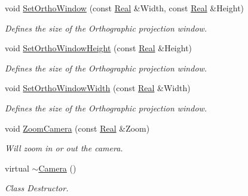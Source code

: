 \begin{DoxyCompactItemize}
void \hyperlink{classphys_1_1Camera_a24cb50ccb644f3f7e925819aba3ddad2}{SetOrthoWindow} (const \hyperlink{namespacephys_af7eb897198d265b8e868f45240230d5f}{Real} \&Width, const \hyperlink{namespacephys_af7eb897198d265b8e868f45240230d5f}{Real} \&Height)
\begin{DoxyCompactList}\small\item\em Defines the size of the Orthographic projection window. \item\end{DoxyCompactList}\item 
void \hyperlink{classphys_1_1Camera_a76c140a73a4d862f260b4a76d85b4e34}{SetOrthoWindowHeight} (const \hyperlink{namespacephys_af7eb897198d265b8e868f45240230d5f}{Real} \&Height)
\begin{DoxyCompactList}\small\item\em Defines the size of the Orthographic projection window. \item\end{DoxyCompactList}\item 
void \hyperlink{classphys_1_1Camera_a1e5ba572ce27880def46538157f4ccb7}{SetOrthoWindowWidth} (const \hyperlink{namespacephys_af7eb897198d265b8e868f45240230d5f}{Real} \&Width)
\begin{DoxyCompactList}\small\item\em Defines the size of the Orthographic projection window. \item\end{DoxyCompactList}\item 
void \hyperlink{classphys_1_1Camera_a66e2854557687d98cc5882363e6d6606}{ZoomCamera} (const \hyperlink{namespacephys_af7eb897198d265b8e868f45240230d5f}{Real} \&Zoom)
\begin{DoxyCompactList}\small\item\em Will zoom in or out the camera. \item\end{DoxyCompactList}\item 
virtual \hyperlink{classphys_1_1Camera_aa45f340a6f7ba0970aa2602a928463ea}{$\sim$Camera} ()
\begin{DoxyCompactList}\small\item\em Class Destructor. \item\end{DoxyCompactList}\end{DoxyCompactItemize}
